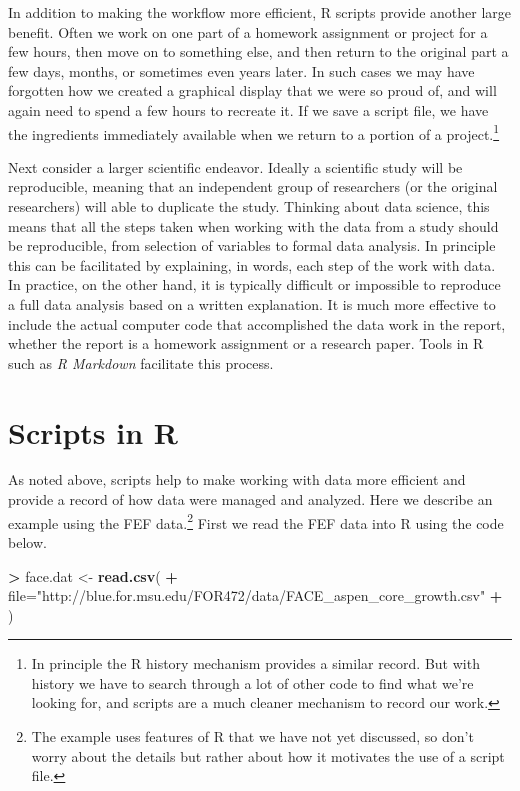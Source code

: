 \documentclass[]{krantz}
\makeatletter
\newenvironment{Shaded}{\begin{snugshade}}{\end{snugshade}}
\newcommand{\KeywordTok}[1]{\textcolor[rgb]{0.27,0.27,0.27}{\textbf{#1}}}
\newcommand{\DataTypeTok}[1]{\textcolor[rgb]{0.27,0.27,0.27}{#1}}
\newcommand{\StringTok}[1]{\textcolor[rgb]{0.5,0.5,0.5}{#1}}
\newcommand{\OperatorTok}[1]{\textcolor[rgb]{0.43,0.43,0.43}{\textbf{#1}}}
\newcommand{\NormalTok}[1]{#1}
\newenvironment{kframe}{%
\medskip{}
\setlength{\fboxsep}{.8em}
 \def\at@end@of@kframe{}%
 \ifinner\ifhmode%
  \def\at@end@of@kframe{\end{minipage}}%
  \begin{minipage}{\columnwidth}%
 \fi\fi%
 \def\FrameCommand##1{\hskip\@totalleftmargin \hskip-\fboxsep
 \colorbox{shadecolor}{##1}\hskip-\fboxsep
     \hskip-\linewidth \hskip-\@totalleftmargin \hskip\columnwidth}%
 \MakeFramed {\advance\hsize-\width
   \@totalleftmargin\z@ \linewidth\hsize
   \@setminipage}}%
 {\par\unskip\endMakeFramed%
 \at@end@of@kframe}
\renewenvironment{Shaded}{\begin{kframe}}{\end{kframe}}
\theoremstyle{definition}
\theoremstyle{definition}
\theoremstyle{definition}
\theoremstyle{remark}
\makeatother
\begin{document}
In addition to making the workflow more efficient, R scripts provide
another large benefit. Often we work on one part of a homework
assignment or project for a few hours, then move on to something else,
and then return to the original part a few days, months, or sometimes
even years later. In such cases we may have forgotten how we created a
graphical display that we were so proud of, and will again need to spend
a few hours to recreate it. If we save a script file, we have the
ingredients immediately available when we return to a portion of a
project.\footnote{In principle the R history mechanism provides a
  similar record. But with history we have to search through a lot of
  other code to find what we're looking for, and scripts are a much
  cleaner mechanism to record our work.}

Next consider a larger scientific endeavor. Ideally a scientific study
will be reproducible, meaning that an independent group of researchers
(or the original researchers) will able to duplicate the study. Thinking
about data science, this means that all the steps taken when working
with the data from a study should be reproducible, from selection of
variables to formal data analysis. In principle this can be facilitated
by explaining, in words, each step of the work with data. In practice,
on the other hand, it is typically difficult or impossible to reproduce
a full data analysis based on a written explanation. It is much more
effective to include the actual computer code that accomplished the data
work in the report, whether the report is a homework assignment or a
research paper. Tools in R such as \emph{R Markdown} facilitate this
process.

\section{Scripts in R}\label{scripts-in-r}

As noted above, scripts help to make working with data more efficient
and provide a record of how data were managed and analyzed. Here we
describe an example using the FEF data.\footnote{The example uses
  features of R that we have not yet discussed, so don't worry about the
  details but rather about how it motivates the use of a script file.}
First we read the FEF data into R using the code below.

\begin{Shaded}
\begin{Highlighting}[]
\OperatorTok{>}\StringTok{ }\NormalTok{face.dat <-}\StringTok{ }\KeywordTok{read.csv}\NormalTok{(}
\OperatorTok{+}\StringTok{     }\DataTypeTok{file=}\StringTok{"http://blue.for.msu.edu/FOR472/data/FACE_aspen_core_growth.csv"}
\OperatorTok{+}\StringTok{ }\NormalTok{)}
\end{Highlighting}
\end{Shaded}
\end{document}
